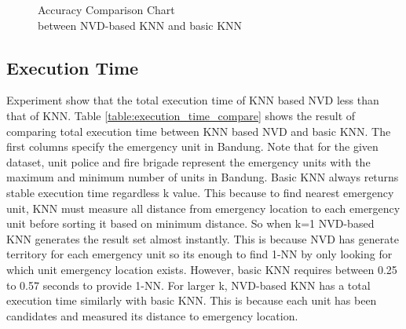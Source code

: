 \begin{figure}[H]
    \centering
    \caption{Accuracy Comparison Chart \\ between NVD-based KNN and basic KNN}
    \label{fig:v_accuracy}
\end{figure}



\pagebreak
\subsection{Execution Time}
Experiment show that the total execution time of KNN based NVD less than that of KNN. Table \ref{table:execution_time_compare} shows the result of comparing total execution time between KNN based NVD and basic KNN. The first columns specify the emergency unit in Bandung. Note that for the given dataset, unit police and fire brigade represent the emergency units with the maximum and minimum number of units in Bandung. Basic KNN always returns stable execution time regardless k value. This because to find nearest emergency unit, KNN must measure all distance from emergency location to each emergency unit before sorting it based on minimum distance. So when k=1 NVD-based KNN generates the result set almost instantly. This is because NVD has generate territory for each emergency unit so its enough to find 1-NN by only looking for which unit emergency location exists. However, basic KNN requires between 0.25 to 0.57 seconds to provide 1-NN. For larger k, NVD-based KNN has a total execution time similarly with basic KNN. This is because each unit has been candidates and measured its  distance to emergency location.

